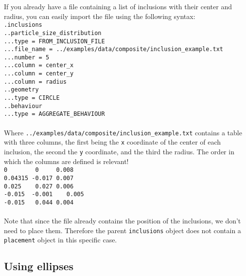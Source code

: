 \documentclass[10pt]{article}
\begin{document}
If you already have a file containing a list of inclusions with their center and radius, you can easily import the file using the following syntax:\\

\noindent \verb+.inclusions+\\
\verb+..particle_size_distribution+\\
\verb+...type = FROM_INCLUSION_FILE+\\
\verb+...file_name = ../examples/data/composite/inclusion_example.txt+\\
\verb+...number = 5+\\
\verb+...column = center_x+\\
\verb+...column = center_y+\\
\verb+...column = radius+\\
\verb+..geometry+\\
\verb+...type = CIRCLE+\\
\verb+..behaviour+\\
\verb+...type = AGGREGATE_BEHAVIOUR+

\paragraph{}Where \verb+../examples/data/composite/inclusion_example.txt+ contains a table with three columns, the first being the \verb+x+ coordinate of the center of each inclusion, the second the \verb+y+ coordinate, and the third the radius. The order in which the columns are defined is relevant!\\

\noindent \verb+0        0     0.008+\\
\verb+0.04315 -0.017 0.007+\\
\verb+0.025    0.027 0.006+\\
\verb+-0.015  -0.001	0.005+\\
\verb+-0.015   0.044 0.004+

\paragraph{}Note that since the file already contains the position of the inclusions, we don't need to place them. Therefore the parent \verb+inclusions+ object does not contain a \verb+placement+ object in this specific case.

\subsection{Using ellipses}
\end{document}
